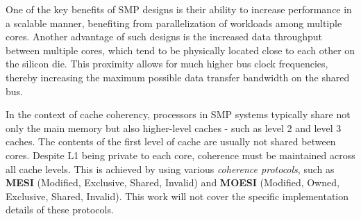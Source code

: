 One of the key benefits of SMP designs is their ability to increase performance in a scalable manner, benefiting from parallelization of workloads among multiple cores.
Another advantage of such designs is the increased data throughput between multiple cores, which tend to be physically located close to each other on the silicon die.
This proximity allows for much higher bus clock frequencies, thereby increasing the maximum possible data transfer bandwidth on the shared bus.

In the context of cache coherency, processors in SMP systems typically share not only the main memory but also higher-level caches - such as level 2 and level 3 caches.
The contents of the first level of cache are usually not shared between cores. Despite L1 being private to each core, coherence must be maintained across all cache levels.
This is achieved by using various \textit{coherence protocols}, such as \textbf{MESI} (Modified, Exclusive, Shared, Invalid) and \textbf{MOESI} (Modified, Owned, Exclusive, Shared, Invalid).
This work will not cover the specific implementation details of these protocols.

